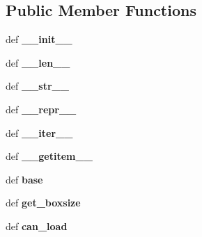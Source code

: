 \subsection*{Public Member Functions}
\begin{DoxyCompactItemize}
\item 
\hypertarget{classseren3_1_1halos_1_1HaloCatalogue_afc6c11182e0b263406774780d004b3fd}{
def {\bfseries \_\-\_\-init\_\-\_\-}}
\label{classseren3_1_1halos_1_1HaloCatalogue_afc6c11182e0b263406774780d004b3fd}

\item 
\hypertarget{classseren3_1_1halos_1_1HaloCatalogue_ae27eb41482bd4060ba828496d9ce7b4b}{
def {\bfseries \_\-\_\-len\_\-\_\-}}
\label{classseren3_1_1halos_1_1HaloCatalogue_ae27eb41482bd4060ba828496d9ce7b4b}

\item 
\hypertarget{classseren3_1_1halos_1_1HaloCatalogue_ae4d2beb4cae43abce0a089320dbddc0c}{
def {\bfseries \_\-\_\-str\_\-\_\-}}
\label{classseren3_1_1halos_1_1HaloCatalogue_ae4d2beb4cae43abce0a089320dbddc0c}

\item 
\hypertarget{classseren3_1_1halos_1_1HaloCatalogue_a7c02e56759bfc0c34b076dc5cdced5f9}{
def {\bfseries \_\-\_\-repr\_\-\_\-}}
\label{classseren3_1_1halos_1_1HaloCatalogue_a7c02e56759bfc0c34b076dc5cdced5f9}

\item 
\hypertarget{classseren3_1_1halos_1_1HaloCatalogue_a2e4abce03d0a2f6a77465a093c8c9896}{
def {\bfseries \_\-\_\-iter\_\-\_\-}}
\label{classseren3_1_1halos_1_1HaloCatalogue_a2e4abce03d0a2f6a77465a093c8c9896}

\item 
\hypertarget{classseren3_1_1halos_1_1HaloCatalogue_a0f6c0b6ef79f3a3389ba46f3eeabb3a1}{
def {\bfseries \_\-\_\-getitem\_\-\_\-}}
\label{classseren3_1_1halos_1_1HaloCatalogue_a0f6c0b6ef79f3a3389ba46f3eeabb3a1}

\item 
\hypertarget{classseren3_1_1halos_1_1HaloCatalogue_ababe8a6da59b188838f53955280b6367}{
def {\bfseries base}}
\label{classseren3_1_1halos_1_1HaloCatalogue_ababe8a6da59b188838f53955280b6367}

\item 
\hypertarget{classseren3_1_1halos_1_1HaloCatalogue_a9c037a596fd2e9f34d3eb7bb2b5e3892}{
def {\bfseries get\_\-boxsize}}
\label{classseren3_1_1halos_1_1HaloCatalogue_a9c037a596fd2e9f34d3eb7bb2b5e3892}

\item 
\hypertarget{classseren3_1_1halos_1_1HaloCatalogue_a47b9f0acc5698365d6d8dde979315c9e}{
def {\bfseries can\_\-load}}
\label{classseren3_1_1halos_1_1HaloCatalogue_a47b9f0acc5698365d6d8dde979315c9e}


\end{DoxyCompactItemize}
